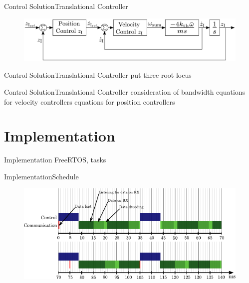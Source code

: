 \begin{frame}{Control Solution}{Translational Controller}
  \vspace*{1cm}
  \Large
  \normalsize
  \pause
  \vspace*{1cm}
  \begin{figure}[H]
    \includegraphics[width=1\linewidth]{figures/TranslationalControlZ}
  \end{figure}
\end{frame}

\begin{frame}{Control Solution}{Translational Controller}
  put three root locus      
\end{frame}

\begin{frame}{Control Solution}{Translational Controller}
  consideration of bandwidth
  equations for velocity controllers
  equations for position controllers
\end{frame}


\section{Implementation}
\begin{frame}{Implementation}{}
  FreeRTOS, tasks
\end{frame}

\begin{frame}{Implementation}{Schedule}
  \begin{figure}[H]
    \hspace*{-.8cm}
    \includegraphics[width=1.1\linewidth]{figures/timingDiagram}
  \end{figure}  
\end{frame}


